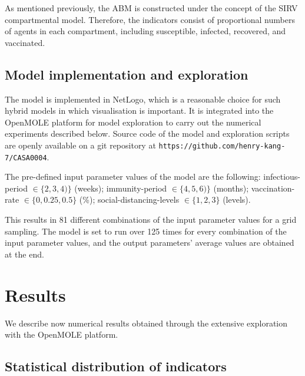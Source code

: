 \documentclass[smallextended]{svjour3}       %
\begin{document}
As mentioned previously, the ABM is constructed under the concept of the SIRV compartmental model. Therefore, the indicators consist of proportional numbers of agents in each compartment, including susceptible, infected, recovered, and vaccinated.






\subsection{Model implementation and exploration}

The model is implemented in NetLogo, which is a reasonable choice for such hybrid models in which visualisation is important. It is integrated into the OpenMOLE platform for model exploration \cite{reuillon2013openmole} to carry out the numerical experiments described below. Source code of the model and exploration scripts are openly available on a git repository at \texttt{https://github.com/henry-kang-7/CASA0004}.


The pre-defined input parameter values of the model are the following: infectious-period $\in \{ 2, 3, 4 )\}$ (weeks); immunity-period $\in \{ 4, 5, 6  )\}$ (months); vaccination-rate $\in \{ 0, 0.25, 0.5 \}$ (\%); social-distancing-levels $\in \{1, 2, 3\}$ (levels).

This results in 81 different combinations of the input parameter values for a grid sampling. The model is set to run over 125 times for every combination of the input parameter values, and the output parameters’ average values are obtained at the end.



\section{Results}


We describe now numerical results obtained through the extensive exploration with the OpenMOLE platform.


\subsection{Statistical distribution of indicators}
\end{document}
